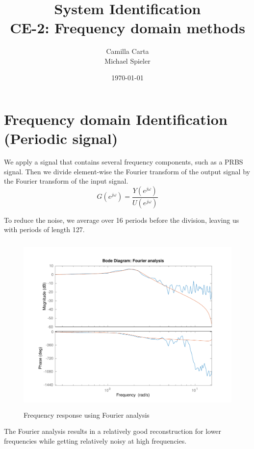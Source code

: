 \documentclass[a4paper,11pt]{article}
\begin{document}
\title{
    System Identification \\
    CE-2: Frequency domain methods
}
\author{Camilla Carta \\ Michael Spieler}
\date{\today}
\maketitle

\section{Frequency domain Identification (Periodic signal)}

We apply a signal that contains several frequency components, such as a PRBS signal. Then we divide element-wise the Fourier transform of the output signal by the Fourier transform of the input signal. 
\begin{equation*}
G(e^{j\omega}) =  \frac{Y(e^{j\omega})}{U(e^{j\omega})}
\end{equation*}

To reduce the noise, we average over 16 periods before the division, leaving us with periods of length 127.

\begin{figure}[H]
	\centering
    \includegraphics[height=9cm]{images/ce2_1_fourier_analysis}
    \caption{Frequency response using Fourier analysis}
    \label{fig:fourier_analysis}
\end{figure}

The Fourier analysis results in a relatively good reconstruction for lower frequencies while getting relatively noisy at high frequencies.
\end{document}
